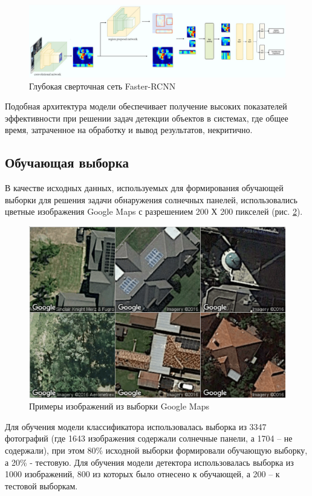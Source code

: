 \begin{figure}[ht]
	\centering
	\includegraphics[width=17cm]{man-source/images/ch4/pic4-21.jpg}
	\caption{Глубокая сверточная сеть Faster-RCNN}
	\label{fig:faster_rcnn}
\end{figure}

Подобная архитектура модели обеспечивает получение высоких показателей эффективности при решении задач детекции объектов в системах, где общее время, затраченное на обработку и вывод результатов, некритично.

\subsection{Обучающая выборка}
В качестве исходных данных, используемых для формирования обучающей выборки для решения задачи обнаружения солнечных панелей, использовались цветные изображения Google Maps с разрешением 200 Х 200 пикселей (рис. \ref{fig:google_maps}).

\begin{figure}[ht]
	\centering
	\includegraphics[width=12cm]{man-source/images/ch4/pic4-17.png}
	\caption{Примеры изображений из выборки Google Maps}
	\label{fig:google_maps}
\end{figure}

Для обучения модели классификатора использовалась выборка из 3347 фотографий (где 1643 изображения содержали солнечные панели, а 1704 -- не содержали), при этом 80\% исходной выборки формировали обучающую выборку, а 20\% - тестовую. Для обучения модели детектора использовалась выборка из 1000 изображений, 800 из которых было отнесено к обучающей, а 200 -- к тестовой выборкам.


